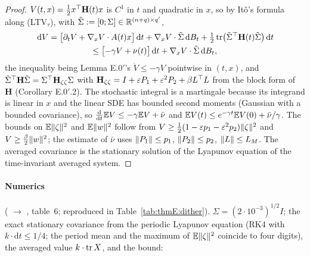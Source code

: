 \begin{proof}
$V(t,x)=\frac12x^\top\mathbf{H}(t)x$ is $C^1$ in $t$ and quadratic in $x$, so by It\^o's formula along
\textup{(LTV$_\tau$)}, with $\tilde\Sigma:=[0;\Sigma]\in\mathbb{R}^{(n+q)\times q'}$,
\begin{multline*}
  \,\mathrm{d} V=\bigl[\partial_tV+\nabla_xV\cdot A(t)x\bigr]\,\mathrm{d} t+\nabla_xV\cdot\tilde\Sigma\,\mathrm{d} B_t
  +\tfrac12\operatorname{tr}\bigl(\tilde\Sigma^\top\mathbf{H}(t)\tilde\Sigma\bigr)\,\mathrm{d} t\\
  \le\bigl[-\gamma V+\nu(t)\bigr]\,\mathrm{d} t+\nabla_xV\cdot\tilde\Sigma\,\mathrm{d} B_t,
\end{multline*}
the inequality being Lemma E.0$'$'s $\dot V\le-\gamma V$ pointwise in $(t,x)$, and
$\tilde\Sigma^\top\mathbf{H}\tilde\Sigma=\Sigma^\top\mathbf{H}_{\zeta\zeta}\Sigma$ with
$\mathbf{H}_{\zeta\zeta}=I+\varepsilon P_1+\varepsilon^2P_2+\beta L^\top L$ from the block form of $\mathbf{H}$
(Corollary E.0$'$.2). The stochastic integral is a martingale because its integrand is linear in $x$ and the linear SDE has
bounded second moments (Gaussian with a bounded covariance), so $\frac{\mathrm{d}}{\mathrm{d}t}\mathbb{E} V\le-\gamma\mathbb{E} V+\bar\nu$ and
$\mathbb{E} V(t)\le e^{-\gamma t}\mathbb{E} V(0)+\bar\nu/\gamma$. The bounds on $\mathbb{E}\lVert \zeta\rVert^2$ and $\mathbb{E}\lVert w\rVert^2$ follow from
$V\ge\frac12(1-\varepsilon p_1-\varepsilon^2p_2)\lVert \zeta\rVert^2$ and $V\ge\frac\beta2\lVert w\rVert^2$; the estimate of
$\bar\nu$ uses $\lVert P_1\rVert\le p_1$, $\lVert P_2\rVert\le p_2$, $\lVert L\rVert\le L_M$. The averaged covariance is the stationary
solution of the Lyapunov equation of the time-invariant averaged system.
\end{proof}

\paragraph{Numerics} ( $\to$ , table~6; reproduced
in Table~\ref{tab:thmE:dither}). $\Sigma=(2\cdot10^{-3})^{1/2}I$; the exact stationary covariance from the periodic
Lyapunov equation (RK4 with $k\cdot\mathrm{d}t\le1/4$; the period mean and the maximum of $\mathbb{E}\lVert \zeta\rVert^2$ coincide
to four digits), the averaged value $k\cdot\operatorname{tr} X$, and the bound:

